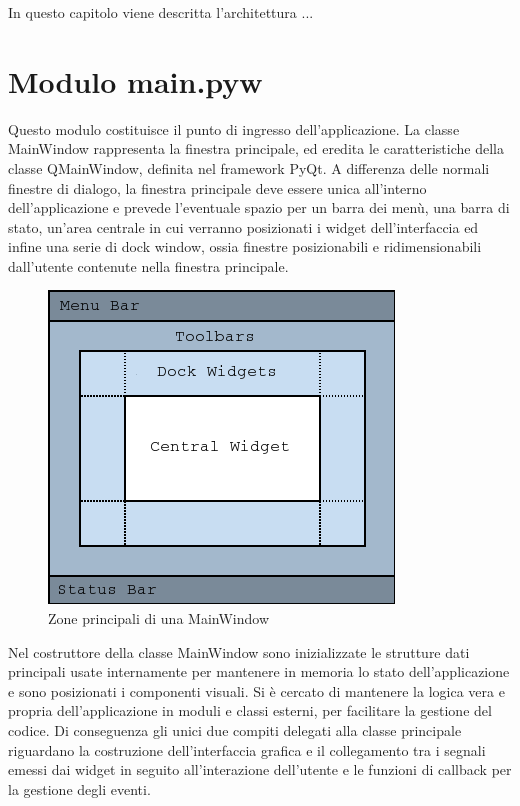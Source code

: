 \documentclass[12pt]{toptesi}
\begin{document}
In questo capitolo viene descritta l'architettura ...

\section{Modulo main.pyw}

Questo modulo costituisce il punto di ingresso dell'applicazione. La classe MainWindow rappresenta la finestra principale, ed eredita le caratteristiche della classe QMainWindow, definita nel framework PyQt. A differenza delle normali finestre di dialogo, la finestra principale deve essere unica all'interno dell'applicazione e prevede l'eventuale spazio per un barra dei menù, una barra di stato, un'area centrale in cui verranno posizionati i widget dell'interfaccia ed infine una serie di dock window, ossia finestre posizionabili e ridimensionabili dall'utente contenute nella finestra principale.

\begin{figure}[htbp]
\begin{center}
\includegraphics{images/mainwindowlayout.png}
\caption{Zone principali di una MainWindow}
\label{default}
\end{center}
\end{figure}

Nel costruttore della classe MainWindow sono inizializzate le strutture dati principali usate internamente per mantenere in memoria lo stato dell'applicazione e sono posizionati i componenti visuali. Si è cercato di mantenere la logica vera e propria dell'applicazione in moduli e classi esterni, per facilitare la gestione del codice. Di conseguenza gli unici due compiti delegati alla classe principale riguardano la costruzione dell'interfaccia grafica e il collegamento tra i segnali emessi dai widget in seguito all'interazione dell'utente e le funzioni di callback per la gestione degli eventi.
\end{document}
